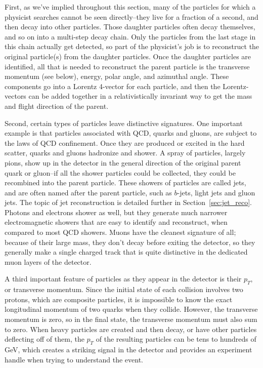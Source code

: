 First, as we've implied throughout this section, many of the particles for which a physicist searches cannot be seen directly--they live for a fraction of a second, and then decay into other particles.  Those daughter particles often decay themselves, and so on into a  multi-step decay chain.  Only the particles from the last stage in this chain actually get detected, so part of the physicist's job is to reconstruct the original particle(s) from the daughter particles.  Once the daughter particles are identified, all that is needed to reconstruct the parent particle is the transverse momentum (see below), energy, polar angle, and azimuthal angle.  These components go into a Lorentz 4-vector for each particle, and then the Lorentz-vectors can be added together in a relativistically invariant way to get the mass and flight direction of the parent.

Second, certain types of particles leave distinctive signatures.  One important example is that particles associated with QCD, quarks and gluons, are subject to the laws of QCD confinement.  Once they are produced or excited in the hard scatter, quarks and gluons hadronize and shower.  A spray of particles, largely pions, show up in the detector in the general direction of the original parent quark or gluon--if all the shower particles could be collected, they could be recombined into the parent particle.  These showers of particles are called jets, and are often named after the parent particle, such as $b$-jets, light jets and gluon jets.  The topic of jet reconstruction is detailed further in Section~\ref{sec:jet_reco}.  Photons and electrons shower as well, but they generate much narrower electromagnetic showers that are easy to identify and reconstruct, when compared to most QCD showers.  Muons have the cleanest signature of all; because of their large mass, they don't decay before exiting the detector, so they generally make a single charged track that is quite distinctive in the dedicated muon layers of the detector.

A third important feature of particles as they appear in the detector is their $p_T$, or transverse momentum.  Since the initial state of each collision involves two protons, which are composite particles, it is impossible to know the exact longitudinal momentum of two quarks when they collide.  However, the transverse momentum is zero, so in the final state, the transverse momentum must also sum to zero.  When heavy particles are created and then decay, or have other particles deflecting off of them, the $p_T$ of the resulting particles can be tens to hundreds of GeV, which creates a striking signal in the detector and provides an experiment handle when trying to understand the event.

